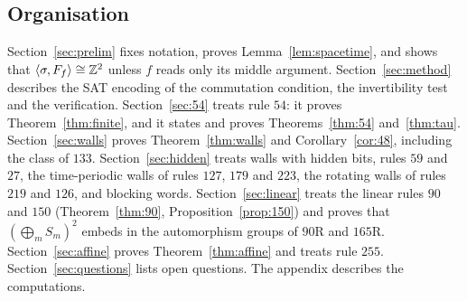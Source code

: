 \subsection*{Organisation}
Section~\ref{sec:prelim} fixes notation, proves Lemma~\ref{lem:spacetime}, and shows that $\langle\sigma,F_f\rangle\cong\mathbb{Z}^2$ unless $f$ reads only its middle argument. Section~\ref{sec:method} describes the SAT encoding of the commutation condition, the invertibility test and the verification. Section~\ref{sec:54} treats rule $54$: it proves Theorem~\ref{thm:finite}, and it states and proves Theorems~\ref{thm:54} and~\ref{thm:tau}. Section~\ref{sec:walls} proves Theorem~\ref{thm:walls} and Corollary~\ref{cor:48}, including the class of $133$. Section~\ref{sec:hidden} treats walls with hidden bits, rules $59$ and $27$, the time-periodic walls of rules $127$, $179$ and $223$, the rotating walls of rules $219$ and $126$, and blocking words. Section~\ref{sec:linear} treats the linear rules $90$ and $150$ (Theorem~\ref{thm:90}, Proposition~\ref{prop:150}) and proves that $(\bigoplus_mS_m)^2$ embeds in the automorphism groups of $90$R and $165$R. Section~\ref{sec:affine} proves Theorem~\ref{thm:affine} and treats rule $255$. Section~\ref{sec:questions} lists open questions. The appendix describes the computations.
